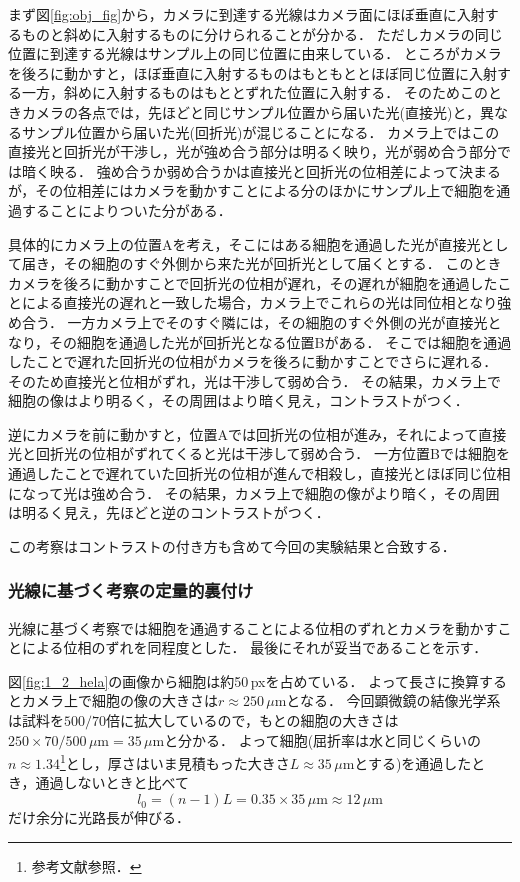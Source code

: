 \documentclass[titlepage]{jsarticle}
\begin{document}
まず図\ref{fig:obj_fig}から，カメラに到達する光線はカメラ面にほぼ垂直に入射するものと斜めに入射するものに分けられることが分かる．
ただしカメラの同じ位置に到達する光線はサンプル上の同じ位置に由来している．
ところがカメラを後ろに動かすと，ほぼ垂直に入射するものはもともととほぼ同じ位置に入射する一方，斜めに入射するものはもととずれた位置に入射する．
そのためこのときカメラの各点では，先ほどと同じサンプル位置から届いた光(直接光)と，異なるサンプル位置から届いた光(回折光)が混じることになる．
カメラ上ではこの直接光と回折光が干渉し，光が強め合う部分は明るく映り，光が弱め合う部分では暗く映る．
強め合うか弱め合うかは直接光と回折光の位相差によって決まるが，その位相差にはカメラを動かすことによる分のほかにサンプル上で細胞を通過することによりついた分がある．

具体的にカメラ上の位置Aを考え，そこにはある細胞を通過した光が直接光として届き，その細胞のすぐ外側から来た光が回折光として届くとする．
このときカメラを後ろに動かすことで回折光の位相が遅れ，その遅れが細胞を通過したことによる直接光の遅れと一致した場合，カメラ上でこれらの光は同位相となり強め合う．
一方カメラ上でそのすぐ隣には，その細胞のすぐ外側の光が直接光となり，その細胞を通過した光が回折光となる位置Bがある．
そこでは細胞を通過したことで遅れた回折光の位相がカメラを後ろに動かすことでさらに遅れる．
そのため直接光と位相がずれ，光は干渉して弱め合う．
その結果，カメラ上で細胞の像はより明るく，その周囲はより暗く見え，コントラストがつく．

逆にカメラを前に動かすと，位置Aでは回折光の位相が進み，それによって直接光と回折光の位相がずれてくると光は干渉して弱め合う．
一方位置Bでは細胞を通過したことで遅れていた回折光の位相が進んで相殺し，直接光とほぼ同じ位相になって光は強め合う．
その結果，カメラ上で細胞の像がより暗く，その周囲は明るく見え，先ほどと逆のコントラストがつく．

この考察はコントラストの付き方も含めて今回の実験結果と合致する．

\subsubsection{光線に基づく考察の定量的裏付け}
光線に基づく考察では細胞を通過することによる位相のずれとカメラを動かすことによる位相のずれを同程度とした．
最後にそれが妥当であることを示す．

図\ref{fig:1_2_hela}の画像から細胞は約50\,pxを占めている．
よって長さに換算するとカメラ上で細胞の像の大きさは$r\approx 250\,\mu$mとなる．
今回顕微鏡の結像光学系は試料を$500/70$倍に拡大しているので，もとの細胞の大きさは$250\times 70/500 \,\mu\mathrm{m}= 35\,\mu\mathrm{m}$と分かる．
よって細胞(屈折率は水と同じくらいの$n\approx 1.34$\footnote{参考文献\cite{nenpyo}参照．}とし，厚さはいま見積もった大きさ$L\approx 35\,\mu$mとする)を通過したとき，通過しないときと比べて
\begin{equation}
    l_0 = (n-1)L = 0.35\times 35\,\mu\mathrm{m} \approx 12\,\mu\mathrm{m}
\end{equation}
だけ余分に光路長が伸びる．
\end{document}

